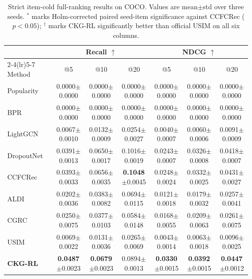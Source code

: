 \documentclass[sigconf,anonymous,review]{acmart}
\newcommand{\sd}[1]{{\footnotesize$\pm$#1}}
\newcommand{\sigmark}[1]{\rlap{\textsuperscript{\scriptsize #1}}}
\begin{document}
\begin{table}[t]
\centering
\caption{Strict item-cold full-ranking results on COCO. Values are mean\(\pm\)std over three seeds. \(^{*}\) marks Holm-corrected paired seed-item significance against CCFCRec (\(p<0.05\)); \(^{\dagger}\) marks CKG-RL significantly better than official USIM on all six columns.}
\label{tab:main-item-cold}
\small
\setlength{\tabcolsep}{2.8pt}
\renewcommand{\arraystretch}{1.10}
\begin{tabular*}{\textwidth}{@{\extracolsep{\fill}}lcccccc}
\toprule
& \multicolumn{3}{c}{Recall \(\uparrow\)} & \multicolumn{3}{c}{NDCG \(\uparrow\)} \\
\cmidrule(lr){2-4}\cmidrule(lr){5-7}
Method & \multicolumn{1}{c}{@5} & \multicolumn{1}{c}{@10} & \multicolumn{1}{c}{@20} & \multicolumn{1}{c}{@5} & \multicolumn{1}{c}{@10} & \multicolumn{1}{c}{@20} \\
\midrule
Popularity & 0.0000\sd{0.0000} & 0.0000\sd{0.0000} & 0.0000\sd{0.0000} & 0.0000\sd{0.0000} & 0.0000\sd{0.0000} & 0.0000\sd{0.0000} \\
BPR~\cite{rendle2009bpr} & 0.0000\sd{0.0000} & 0.0000\sd{0.0000} & 0.0000\sd{0.0000} & 0.0000\sd{0.0000} & 0.0000\sd{0.0000} & 0.0000\sd{0.0000} \\
LightGCN~\cite{he2020lightgcn} & 0.0067\sd{0.0010} & 0.0132\sd{0.0009} & 0.0254\sd{0.0027} & 0.0040\sd{0.0007} & 0.0060\sd{0.0006} & 0.0091\sd{0.0009} \\
DropoutNet~\cite{volkovs2017dropoutnet} & 0.0391\sd{0.0013} & 0.0650\sd{0.0017} & 0.1016\sd{0.0019} & 0.0243\sd{0.0007} & 0.0326\sd{0.0008} & 0.0418\sd{0.0007} \\
CCFCRec~\cite{zhou2023ccfcrec} & 0.0393\sd{0.0033} & 0.0656\sd{0.0035} & \textbf{0.1048}\sd{0.0045} & 0.0248\sd{0.0024} & 0.0332\sd{0.0025} & 0.0431\sd{0.0027} \\
ALDI~\cite{huang2023aldi} & 0.0202\sd{0.0036} & 0.0383\sd{0.0082} & 0.0694\sd{0.0115} & 0.0121\sd{0.0018} & 0.0179\sd{0.0032} & 0.0257\sd{0.0041} \\
CGRC~\cite{kim2024cgrc} & 0.0250\sd{0.0075} & 0.0377\sd{0.0103} & 0.0584\sd{0.0148} & 0.0168\sd{0.0055} & 0.0209\sd{0.0063} & 0.0261\sd{0.0075} \\
USIM~\cite{zhao2024usim} & 0.0069\sd{0.0022} & 0.0131\sd{0.0036} & 0.0265\sd{0.0069} & 0.0043\sd{0.0014} & 0.0063\sd{0.0018} & 0.0096\sd{0.0025} \\
\textbf{CKG-RL}\sigmark{$\dagger$} & \textbf{0.0487}\sd{0.0023}\sigmark{*} & \textbf{0.0679}\sd{0.0023} & 0.0894\sd{0.0013} & \textbf{0.0330}\sd{0.0015}\sigmark{*} & \textbf{0.0392}\sd{0.0015}\sigmark{*} & \textbf{0.0447}\sd{0.0012} \\
\bottomrule
\end{tabular*}
\end{table}
\end{document}
